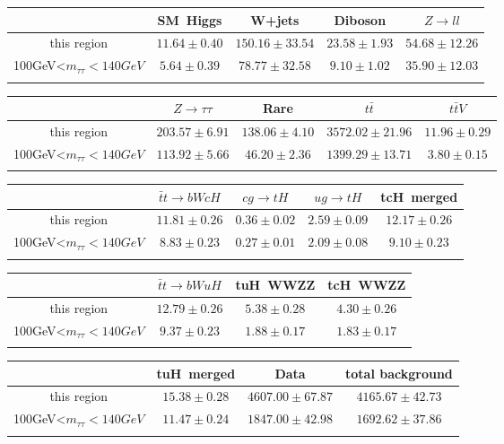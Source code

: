 \centering
\begin{tabular}{ccccc} \toprule\toprule
 & SM~Higgs & W+jets & Diboson & $Z\to ll$\\\midrule
this region & $11.64\pm0.40$ & $150.16\pm33.54$ & $23.58\pm1.93$ & $54.68\pm12.26$\\
100GeV<$m_{\tau\tau}<140GeV$ & $5.64\pm0.39$ & $78.77\pm32.58$ & $9.10\pm1.02$ & $35.90\pm12.03$\\
\bottomrule\bottomrule\\
\end{tabular}
\begin{tabular}{ccccc} \toprule\toprule
 & $Z\to \tau\tau$ & Rare & $t\bar{t}$ & $t\bar{t}V$\\\midrule
this region & $203.57\pm6.91$ & $138.06\pm4.10$ & $3572.02\pm21.96$ & $11.96\pm0.29$\\
100GeV<$m_{\tau\tau}<140GeV$ & $113.92\pm5.66$ & $46.20\pm2.36$ & $1399.29\pm13.71$ & $3.80\pm0.15$\\
\bottomrule\bottomrule\\
\end{tabular}
\begin{tabular}{ccccc} \toprule\toprule
 & $\bar{t}t\to bWcH$ & $cg\to tH$ & $ug\to tH$ & tcH~merged\\\midrule
this region & $11.81\pm0.26$ & $0.36\pm0.02$ & $2.59\pm0.09$ & $12.17\pm0.26$\\
100GeV<$m_{\tau\tau}<140GeV$ & $8.83\pm0.23$ & $0.27\pm0.01$ & $2.09\pm0.08$ & $9.10\pm0.23$\\
\bottomrule\bottomrule\\
\end{tabular}
\begin{tabular}{cccc} \toprule\toprule
 & $\bar{t}t\to bWuH$ & tuH~WWZZ & tcH~WWZZ\\\midrule
this region & $12.79\pm0.26$ & $5.38\pm0.28$ & $4.30\pm0.26$\\
100GeV<$m_{\tau\tau}<140GeV$ & $9.37\pm0.23$ & $1.88\pm0.17$ & $1.83\pm0.17$\\
\bottomrule\bottomrule\\
\end{tabular}
\begin{tabular}{cccc} \toprule\toprule
 & tuH~merged & Data & total background\\\midrule
this region & $15.38\pm0.28$ & $4607.00\pm67.87$ & $4165.67\pm42.73$\\
100GeV<$m_{\tau\tau}<140GeV$ & $11.47\pm0.24$ & $1847.00\pm42.98$ & $1692.62\pm37.86$\\
\bottomrule\bottomrule\\
\end{tabular}
